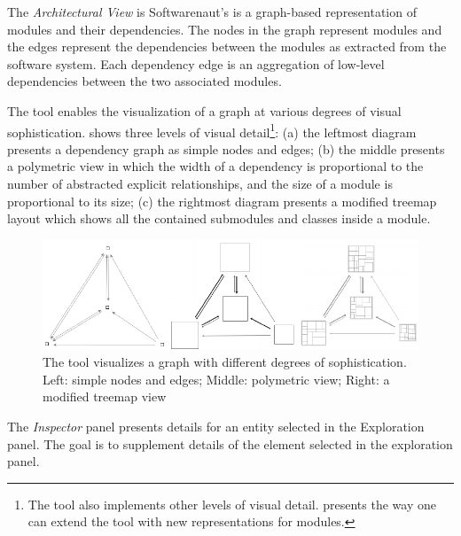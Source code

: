 \documentclass[preprint,12pt]{elsarticle}
\begin{document}
\begin{description}
\item The {\em Architectural View} is Softwarenaut's is a graph-based representation of modules and their dependencies. The nodes in the graph represent modules and the edges represent the dependencies between the modules as extracted from the software system. Each dependency edge is an aggregation of low-level dependencies between the two associated modules. 



The tool enables the visualization of a graph at various degrees of visual sophistication.  shows three levels of visual detail\footnote{The tool also implements other levels of visual detail.  presents the way one can extend the tool with new representations for modules.}: (a) the leftmost diagram presents a dependency graph as simple nodes and edges; (b) the middle presents a polymetric view \cite{lanza-pv} in which the width of a dependency is proportional to the number of abstracted explicit relationships, and the size of a module is proportional to its size; (c) the rightmost diagram presents a modified treemap layout which shows all the contained submodules and classes inside a module. 

\begin{figure}[h]
\begin{center}
\includegraphics[width=1.04\linewidth]{sofistication}
\caption{The tool visualizes a graph with different degrees of sophistication. Left: simple nodes and edges; Middle: polymetric view; Right: a modified treemap view}
\end{center}
\end{figure}

\item The {\em Inspector} panel presents details for an entity selected in the Exploration panel. The goal is to supplement details of the element selected in the exploration panel. %


\end{description}
\end{document}
